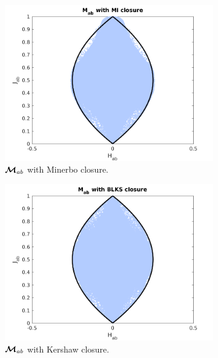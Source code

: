 \begin{figure}[h!]
  \begin{subfigure}[b]{0.5\textwidth}
    \includegraphics[width=\textwidth]{figures/MabWithMI}
    \caption{$\boldsymbol{\mathcal{M}}_{ab}$ with Minerbo closure.}
  \end{subfigure}
  \begin{subfigure}[b]{0.5\textwidth}
    \includegraphics[width=\textwidth]{figures/MabWithBLKS}
    \caption{$\boldsymbol{\mathcal{M}}_{ab}$ with Kershaw closure.}
  \end{subfigure}
  \begin{subfigure}[b]{0.5\textwidth}

\end{subfigure}
\end{figure}
